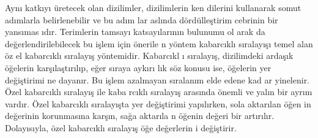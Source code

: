 \documentclass[a4paper,10pt]{article}
\begin{document}
Ayn{\i} katk\i y{\i} \"uretecek olan dizilimler, dizilimlerin ken%
dilerini kullanarak somut ad\i mlarla belirlenebilir ve bu ad\i m%
lar asl\i nda d\"ord\"ulle\c{s}tirim ceb\-ri\-nin bir yans{\i}mas%
{\i}d\i r. Terimlerin tamsay{\i} katsay\i lar\i n\i n bulunumu ol%
arak da de\u{g}erlendirilebilecek bu i\c{s}lem i\c{c}in \"onerile%
n y\"ontem kabarc\i kl{\i} s\i ralay{\i}\c{s}{\i} temel alan \"oz%
el kabarc\i kl{\i} s\i ralay\i \c{s} y\"ontemidir. Ka\-barc{\i}kl%
{\i} s\i ralay\i \c{s}, dizilimdeki arda\c{s}\i k \"o\u{g}elerin %
kar\c{s}\i la\c{s}t\i r\i l\i p, e\u{g}er s\i raya ay\-k{\i}r{\i}%
l{\i}k s\"oz konusu ise, \"o\u{g}elerin yer de\u{g}i\c{s}\-tirimi%
ne dayan\i r. Bu i\c{s}lem azalmayan s\i ralan\i m elde edene kad%
ar yinelenir. \"Ozel kabarc\i kl{\i} s\i ralay\i \c{s} i\-le kaba%
rc\i kl{\i} s\i ralay\i \c{s} aras\i nda \"onemli ve yal\i n bir %
ayr\i m vard\i r. \"Ozel kabarc\i kl{\i} s\i ralay\i \c{s}ta yer %
de\u{g}i\c{s}tirimi yap\i l\i rken, so\-la aktar\i lan \"o\u{g}en%
in de\u{g}erinin korunmas\i na kar\c{s}\i n, sa\u{g}a aktar{\i}la%
n \"o\u{g}enin de\u{g}eri bir art\i r\i l\i r. Dolay{\i}s\i yla, %
\"ozel kabarc\i kl{\i} s\i ralay\i \c{s} \"o\u{g}e de\u{g}erlerin%
i de\u{g}i\c{s}tirir. %
\end{document}
